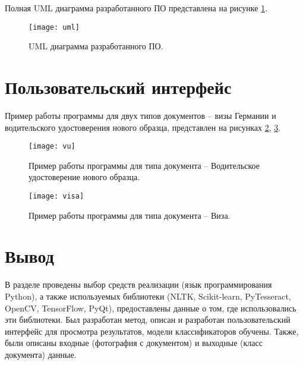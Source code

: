 Полная UML диаграмма разработанного ПО представлена на рисунке \ref{img:uml}.

\begin{figure}[H]
	\centering
	\texttt{[image: uml]}
	\caption{UML диаграмма разработанного ПО. }
	\label{img:uml}
\end{figure}

\section{Пользовательский интерфейс }

Пример работы программы для двух типов документов -- визы Германии и водительского удостоверения нового образца, представлен на рисунках \ref{img:vu}, \ref{img:visa}.

\begin{figure}[H]
	\centering
	\texttt{[image: vu]}
	\caption{Пример работы программы для типа документа -- Водительское удостоверение нового образца. }
	\label{img:vu}
\end{figure}

\begin{figure}[H]
	\centering
	\texttt{[image: visa]}
	\caption{Пример работы программы для типа документа -- Виза. }
	\label{img:visa}
\end{figure}

\section{Вывод}

В разделе проведены выбор средств реализации (язык программирования Python), а также используемых библиотеки (NLTK, Scikit-learn, PyTesseract, OpenCV, TensorFlow, PyQt), предоставлены данные о том, где использовались эти библиотеки. Был разработан метод, описан и разработан пользовательский интерфейс для просмотра результатов, модели классификаторов обучены. Также, были описаны входные (фотография с документом) и выходные (класс документа) данные.
